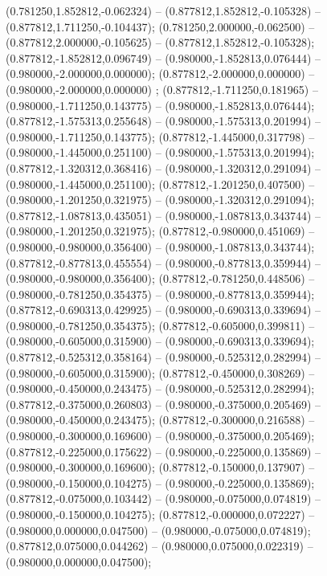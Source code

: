  (0.781250,1.852812,-0.062324) -- (0.877812,1.852812,-0.105328) -- (0.877812,1.711250,-0.104437);
 (0.781250,2.000000,-0.062500) -- (0.877812,2.000000,-0.105625) -- (0.877812,1.852812,-0.105328);
 (0.877812,-1.852812,0.096749) -- (0.980000,-1.852813,0.076444) -- (0.980000,-2.000000,0.000000);
 (0.877812,-2.000000,0.000000) -- (0.980000,-2.000000,0.000000) ;
 (0.877812,-1.711250,0.181965) -- (0.980000,-1.711250,0.143775) -- (0.980000,-1.852813,0.076444);
 (0.877812,-1.575313,0.255648) -- (0.980000,-1.575313,0.201994) -- (0.980000,-1.711250,0.143775);
 (0.877812,-1.445000,0.317798) -- (0.980000,-1.445000,0.251100) -- (0.980000,-1.575313,0.201994);
 (0.877812,-1.320312,0.368416) -- (0.980000,-1.320312,0.291094) -- (0.980000,-1.445000,0.251100);
 (0.877812,-1.201250,0.407500) -- (0.980000,-1.201250,0.321975) -- (0.980000,-1.320312,0.291094);
 (0.877812,-1.087813,0.435051) -- (0.980000,-1.087813,0.343744) -- (0.980000,-1.201250,0.321975);
 (0.877812,-0.980000,0.451069) -- (0.980000,-0.980000,0.356400) -- (0.980000,-1.087813,0.343744);
 (0.877812,-0.877813,0.455554) -- (0.980000,-0.877813,0.359944) -- (0.980000,-0.980000,0.356400);
 (0.877812,-0.781250,0.448506) -- (0.980000,-0.781250,0.354375) -- (0.980000,-0.877813,0.359944);
 (0.877812,-0.690313,0.429925) -- (0.980000,-0.690313,0.339694) -- (0.980000,-0.781250,0.354375);
 (0.877812,-0.605000,0.399811) -- (0.980000,-0.605000,0.315900) -- (0.980000,-0.690313,0.339694);
 (0.877812,-0.525312,0.358164) -- (0.980000,-0.525312,0.282994) -- (0.980000,-0.605000,0.315900);
 (0.877812,-0.450000,0.308269) -- (0.980000,-0.450000,0.243475) -- (0.980000,-0.525312,0.282994);
 (0.877812,-0.375000,0.260803) -- (0.980000,-0.375000,0.205469) -- (0.980000,-0.450000,0.243475);
 (0.877812,-0.300000,0.216588) -- (0.980000,-0.300000,0.169600) -- (0.980000,-0.375000,0.205469);
 (0.877812,-0.225000,0.175622) -- (0.980000,-0.225000,0.135869) -- (0.980000,-0.300000,0.169600);
 (0.877812,-0.150000,0.137907) -- (0.980000,-0.150000,0.104275) -- (0.980000,-0.225000,0.135869);
 (0.877812,-0.075000,0.103442) -- (0.980000,-0.075000,0.074819) -- (0.980000,-0.150000,0.104275);
 (0.877812,-0.000000,0.072227) -- (0.980000,0.000000,0.047500) -- (0.980000,-0.075000,0.074819);
 (0.877812,0.075000,0.044262) -- (0.980000,0.075000,0.022319) -- (0.980000,0.000000,0.047500);
